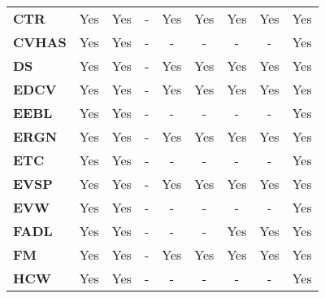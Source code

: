 \begin{table}[ht!]
\begin{tabular}{lcccccccc}
\textbf{CTR}         & Yes             & Yes             & -                   & Yes            & Yes                  & Yes                   & Yes                   & Yes             \\
\textbf{CVHAS}       & Yes             & Yes             & -                   & -              & -                    & -                     & -                     & Yes             \\
\textbf{DS}          & Yes             & Yes             & -                   & Yes            & Yes                  & Yes                   & Yes                   & Yes             \\
\textbf{EDCV}        & Yes             & Yes             & -                   & Yes            & Yes                  & Yes                   & Yes                   & Yes             \\
\textbf{EEBL}        & Yes             & Yes             & -                   & -              & -                    & -                     & -                     & Yes             \\
\textbf{ERGN}        & Yes             & Yes             & -                   & Yes            & Yes                  & Yes                   & Yes                   & Yes             \\
\textbf{ETC}         & Yes             & Yes             & -                   & -              & -                    & -                     & -                     & Yes             \\
\textbf{EVSP}        & Yes             & Yes             & -                   & Yes            & Yes                  & Yes                   & Yes                   & Yes             \\
\textbf{EVW}         & Yes             & Yes             & -                   & -              & -                    & -                     & -                     & Yes             \\
\textbf{FADL}        & Yes             & Yes             & -                   & -              & -                    & Yes                   & Yes                   & Yes             \\
\textbf{FM}          & Yes             & Yes             & -                   & Yes            & Yes                  & Yes                   & Yes                   & Yes             \\
\textbf{HCW}         & Yes             & Yes             & -                   & -              & -                    & -                     & -                     & Yes             \\

\end{tabular}
\end{table}
